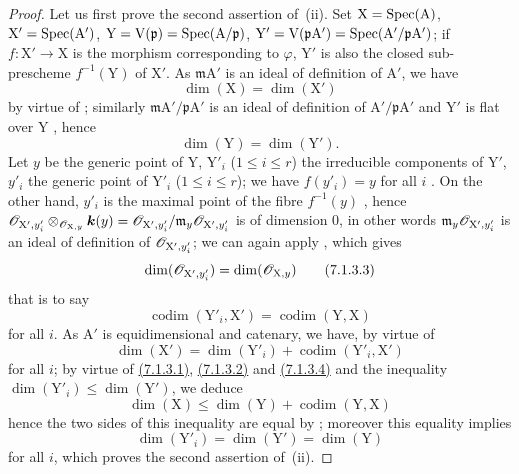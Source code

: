 \begin{proof}
Let us first prove the second assertion of~(ii).
Set $\mathrm{X}=\operatorname{Spec}(\mathrm{A})$, $\mathrm{X}'=\operatorname{Spec}(\mathrm{A}')$, $\mathrm{Y}=\mathrm{V}(\mathfrak{p})=\operatorname{Spec}(\mathrm{A}/\mathfrak{p})$, $\mathrm{Y}'=\mathrm{V}(\mathfrak{p}\mathrm{A}')=\operatorname{Spec}(\mathrm{A}'/\mathfrak{p}\mathrm{A}')$; if $f:\mathrm{X}'\to\mathrm{X}$ is the morphism corresponding to $\varphi$, $\mathrm{Y}'$ is also the closed sub-prescheme $f^{-1}(\mathrm{Y})$ of $\mathrm{X}'$.
As $\mathfrak{m}\mathrm{A}'$ is an ideal of definition of $\mathrm{A}'$, we have
\[
  \dim(\mathrm{X})=\dim(\mathrm{X}')
  \tag{7.1.3.1}
\label{IV.7.1.3.1}
\]
by virtue of ; similarly $\mathfrak{m}\mathrm{A}'/\mathfrak{p}\mathrm{A}'$ is an ideal of definition of $\mathrm{A}'/\mathfrak{p}\mathrm{A}'$ and $\mathrm{Y}'$ is flat over $\mathrm{Y}$ , hence 
\[
  \dim(\mathrm{Y})=\dim(\mathrm{Y}').
  \tag{7.1.3.2}
\label{IV.7.1.3.2}
\]
Let $y$ be the generic point of $\mathrm{Y}$, $\mathrm{Y}'_i$ ($1\leqslant i\leqslant r$) the irreducible components of $\mathrm{Y}'$, $y'_i$ the generic point of $\mathrm{Y}'_i$ ($1\leqslant i\leqslant r$); we have $f(y'_i)=y$ for all $i$ .
On the other hand, $y'_i$ is the maximal point of the fibre $f^{-1}(y)$ , hence $\mathscr{O}_{\mathrm{X}',y'_i}\otimes_{\mathscr{O}_{\mathrm{X},y}}\boldsymbol{k}(y)=\mathscr{O}_{\mathrm{X}',y'_i}/\mathfrak{m}_y\mathscr{O}_{\mathrm{X}',y'_i}$ is of dimension $0$, in other words $\mathfrak{m}_y\mathscr{O}_{\mathrm{X}',y'_i}$ is an ideal of definition of $\mathscr{O}_{\mathrm{X}',y'_i}$; we can again apply , which gives
\[
  \dim(\mathscr{O}_{\mathrm{X}',y'_i})=\dim(\mathscr{O}_{\mathrm{X},y})
  \label{IV.7.1.3.3}
\tag{7.1.3.3}
\]
that is to say 
\[
  \operatorname{codim}(\mathrm{Y}'_i,\mathrm{X}')=\operatorname{codim}(\mathrm{Y},\mathrm{X})
  \tag{7.1.3.4}
\label{IV.7.1.3.4}
\]
for all $i$.
As $\mathrm{A}'$ is equidimensional and catenary, we have, by virtue of 
\[
  \dim(\mathrm{X}')=\dim(\mathrm{Y}'_i)+\operatorname{codim}(\mathrm{Y}'_i,\mathrm{X}')
  \label{IV.7.1.3.5}
\tag{7.1.3.5}
\]
for all $i$; by virtue of {\hyperref[IV.7.1.3.1]{(7.1.3.1)}}, {\hyperref[IV.7.1.3.2]{(7.1.3.2)}} and {\hyperref[IV.7.1.3.4]{(7.1.3.4)}} and the inequality $\dim(\mathrm{Y}'_i)\leqslant\dim(\mathrm{Y}')$, we deduce
\[
  \dim(\mathrm{X})\leqslant\dim(\mathrm{Y})+\operatorname{codim}(\mathrm{Y},\mathrm{X})
  \tag{7.1.3.6}
\label{IV.7.1.3.6}
\]
hence the two sides of this inequality are equal by ; moreover this equality implies
\[
  \dim(\mathrm{Y}'_i)=\dim(\mathrm{Y}')=\dim(\mathrm{Y})
  \label{IV.7.1.3.7}
\tag{7.1.3.7}
\]
for all $i$, which proves the second assertion of~(ii).


\end{proof}
